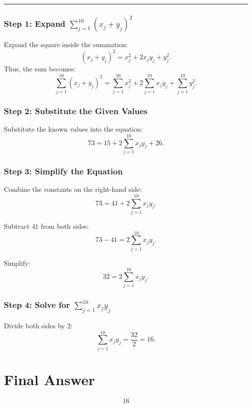 \documentclass{article}
\newcommand{\HRule}[1]{\rule{\linewidth}{#1}}
\begin{document}
\HRule{0.5pt} 
\subsubsection*{Step 1: Expand \(\sum_{j=1}^{10} (x_j + y_j)^2\)}
Expand the square inside the summation:
\[
(x_j + y_j)^2 = x_j^2 + 2x_j y_j + y_j^2.
\]
Thus, the sum becomes:
\[
\sum_{j=1}^{10} (x_j + y_j)^2 = \sum_{j=1}^{10} x_j^2 + 2 \sum_{j=1}^{10} x_j y_j + \sum_{j=1}^{10} y_j^2.
\]

\subsubsection*{Step 2: Substitute the Given Values}
Substitute the known values into the equation:
\[
73 = 15 + 2 \sum_{j=1}^{10} x_j y_j + 26.
\]

\subsubsection*{Step 3: Simplify the Equation}
Combine the constants on the right-hand side:
\[
73 = 41 + 2 \sum_{j=1}^{10} x_j y_j.
\]

Subtract \(41\) from both sides:
\[
73 - 41 = 2 \sum_{j=1}^{10} x_j y_j.
\]

Simplify:
\[
32 = 2 \sum_{j=1}^{10} x_j y_j.
\]

\subsubsection*{Step 4: Solve for \(\sum_{j=1}^{10} x_j y_j\)}
Divide both sides by \(2\):
\[
\sum_{j=1}^{10} x_j y_j = \frac{32}{2} = 16.
\]

\section*{Final Answer}
\[
\boxed{16}
\]
\end{document}
